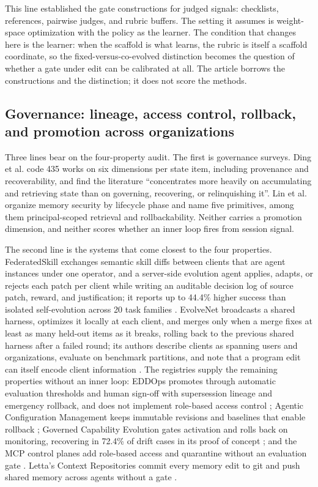 \documentclass[
  11pt,
]{article}
\begin{document}
This line established the gate constructions for judged signals: checklists, references, pairwise judges, and rubric buffers. The setting it assumes is weight-space optimization with the policy as the learner. The condition that changes here is the learner: when the scaffold is what learns, the rubric is itself a scaffold coordinate, so the fixed-versus-co-evolved distinction becomes the question of whether a gate under edit can be calibrated at all. The article borrows the constructions and the distinction; it does not score the methods.

\subsection{Governance: lineage, access control, rollback, and promotion across organizations}\label{app:related-4}

Three lines bear on the four-property audit. The first is governance surveys. Ding et al. \cite{ding2026alwayson} code 435 works on six dimensions per state item, including provenance and recoverability, and find the literature ``concentrates more heavily on accumulating and retrieving state than on governing, recovering, or relinquishing it''. Lin et al. \cite{lin2026memorysecurity} organize memory security by lifecycle phase and name five primitives, among them principal-scoped retrieval and rollbackability. Neither carries a promotion dimension, and neither scores whether an inner loop fires from session signal.

The second line is the systems that come closest to the four properties. FederatedSkill exchanges semantic skill diffs between clients that are agent instances under one operator, and a server-side evolution agent applies, adapts, or rejects each patch per client while writing an auditable decision log of source patch, reward, and justification; it reports up to 44.4\% higher success than isolated self-evolution across 20 task families \cite{yang2026federatedskill}. EvolveNet broadcasts a shared harness, optimizes it locally at each client, and merges only when a merge fixes at least as many held-out items as it breaks, rolling back to the previous shared harness after a failed round; its authors describe clients as spanning users and organizations, evaluate on benchmark partitions, and note that a program edit can itself encode client information \cite{nie2026evolvenet}. The registries supply the remaining properties without an inner loop: EDDOps promotes through automatic evaluation thresholds and human sign-off with supersession lineage and emergency rollback, and does not implement role-based access control \cite{kang2026registry}; Agentic Configuration Management keeps immutable revisions and baselines that enable rollback \cite{quessadavial2026acm}; Governed Capability Evolution gates activation and rolls back on monitoring, recovering in 72.4\% of drift cases in its proof of concept \cite{qin2026governed}; and the MCP control planes add role-based access and quarantine without an evaluation gate \cite{agenticcommunity2026mcpgateway, microsoft2026apicentermcp, truefoundry2026mcpgateway}. Letta's Context Repositories commit every memory edit to git and push shared memory across agents without a gate \cite{letta2026memfs}.
\end{document}
